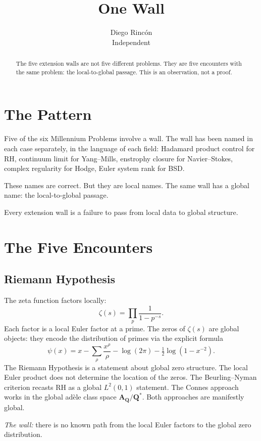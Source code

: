 \documentclass[12pt]{article}
\title{One Wall}
\author{Diego Rinc\'on\\
\small Independent}
\date{}
\begin{document}
\maketitle

\begin{abstract}
The five extension walls are not five different problems.
They are five encounters with the same problem:
the local-to-global passage.
This is an observation, not a proof.
\end{abstract}

\section{The Pattern}

Five of the six Millennium Problems involve a wall.
The wall has been named in each case separately,
in the language of each field:
Hadamard product control for RH,
continuum limit for Yang--Mills,
enstrophy closure for Navier--Stokes,
complex regularity for Hodge,
Euler system rank for BSD.

These names are correct.
But they are local names.
The same wall has a global name:
the local-to-global passage.

Every extension wall is a failure to pass
from local data to global structure.

\section{The Five Encounters}

\subsection*{Riemann Hypothesis}

The zeta function factors locally:
$$\zeta(s) = \prod_p \frac{1}{1 - p^{-s}}.$$
Each factor is a local Euler factor at a prime.
The zeros of $\zeta(s)$ are global objects:
they encode the distribution of primes via the explicit formula
$$\psi(x) = x - \sum_\rho \frac{x^\rho}{\rho} - \log(2\pi) - \tfrac{1}{2}\log(1 - x^{-2}).$$
The Riemann Hypothesis is a statement about global zero structure.
The local Euler product does not determine the location of the zeros.
The Beurling--Nyman criterion recasts RH as a global $L^2(0,1)$ statement.
The Connes approach works in the global ad\`ele class space $\mathbf{A}_\mathbf{Q}/\mathbf{Q}^*$.
Both approaches are manifestly global.

\textit{The wall:} there is no known path from the local Euler factors
to the global zero distribution.
\end{document}
